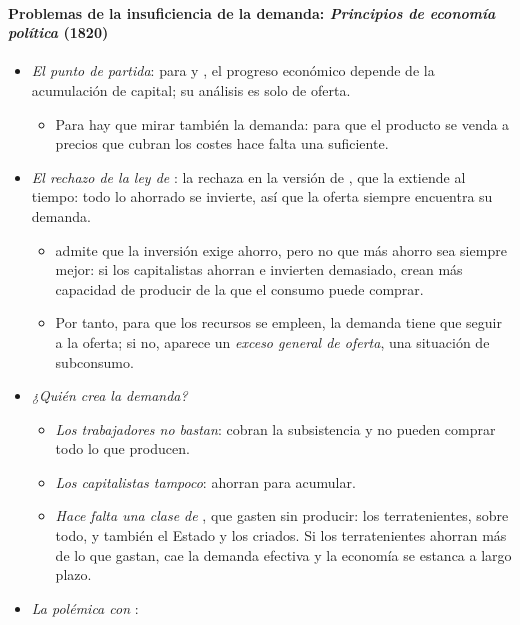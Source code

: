 \documentclass[11pt]{article}
\begin{document}
\paragraph{Problemas de la insuficiencia de la demanda: \emph{Principios de economía política} (1820)}\label{sec:malthus-demanda}
\begin{itemize}
\item \emph{El punto de partida}: para  y , el progreso económico depende de la acumulación de capital; su análisis es solo de oferta.
  \begin{itemize}
  \item Para  hay que mirar también la demanda: para que el producto se venda a precios que cubran los costes hace falta una  suficiente\nocite{Malthus1820Principles}.
  \end{itemize}
\item \emph{El rechazo de la ley de }:  la rechaza en la versión de , que la extiende al tiempo: todo lo ahorrado se invierte, así que la oferta siempre encuentra su demanda.
  \begin{itemize}
  \item {} admite que la inversión exige ahorro, pero no que más ahorro sea siempre mejor: si los capitalistas ahorran e invierten demasiado, crean más capacidad de producir de la que el consumo puede comprar.
  \item Por tanto, para que los recursos se empleen, la demanda tiene que seguir a la oferta; si no, aparece un \emph{exceso general de oferta}, una situación de subconsumo.
  \end{itemize}
\item \emph{¿Quién crea la demanda?}
  \begin{itemize}
  \item \emph{Los trabajadores no bastan}: cobran la subsistencia y no pueden comprar todo lo que producen.
  \item \emph{Los capitalistas tampoco}: ahorran para acumular.
  \item \emph{Hace falta una clase de }, que gasten sin producir: los terratenientes, sobre todo, y también el Estado y los criados. Si los terratenientes ahorran más de lo que gastan, cae la demanda efectiva y la economía se estanca a largo plazo.
  \end{itemize}
\item \emph{La polémica con }:

\end{itemize}
\end{document}
